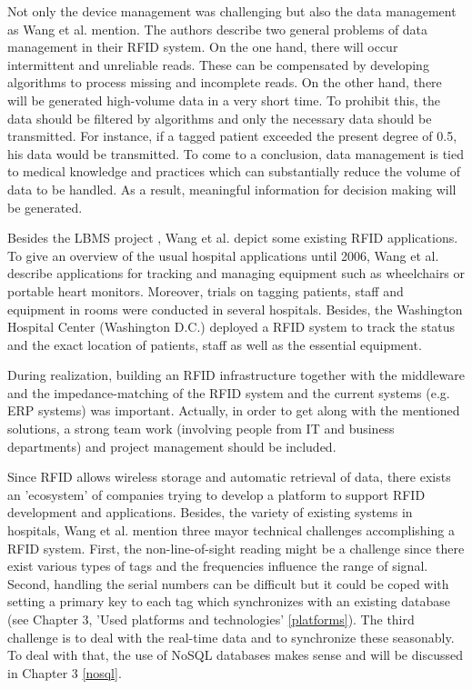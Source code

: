 Not only the device management was challenging but also the data management as Wang et al. mention. The authors describe two general problems of data management in their RFID system. On the one hand, there will occur intermittent and unreliable reads. These can be compensated by developing algorithms to process missing and incomplete reads. On the other hand, there will be generated high-volume data in a very short time. To prohibit this, the data should be filtered by algorithms and only the necessary data should be transmitted. For instance, if a tagged patient exceeded the present degree of 0.5\celsius, his data would be transmitted. To come to a conclusion, data management is tied to medical knowledge and practices which can substantially reduce the volume of data to be handled. As a result, meaningful information for decision making will be generated.
 
Besides the LBMS project \cite[p.2 ff.]{casestudy}, Wang et al. depict some existing RFID applications.
To give an overview of the usual hospital applications until 2006, Wang et al. describe applications for tracking and managing equipment such as wheelchairs or portable heart monitors. Moreover, trials on tagging patients, staff and equipment in rooms were conducted in several hospitals. Besides, the Washington Hospital Center (Washington D.C.) deployed a RFID system to track the status and the exact location of patients, staff as well as the essential equipment.

During realization, building an RFID infrastructure together with the middleware and the impedance-matching of the RFID system and the current systems (e.g. \ac{ERP} systems) was important. Actually, in order to get along with the mentioned solutions, a strong team work (involving people from IT and business departments) and project management should be included. 

Since RFID allows wireless storage and automatic retrieval of data, there exists an 'ecosystem' of companies trying to develop a platform to support RFID development and applications. Besides, the variety of existing systems in hospitals, Wang et al. mention three mayor technical challenges accomplishing a RFID system. First, the non-line-of-sight reading might be a challenge since there exist various types of tags and the frequencies influence the range of signal. Second, handling the serial numbers can be difficult but it could be coped with setting a primary key to each tag which synchronizes with an existing database (see Chapter 3, 'Used platforms and technologies' \ref{platforms}).
The third challenge is to deal with the real-time data and to synchronize these seasonably. To deal with that, the use of NoSQL databases makes sense and will be discussed in Chapter 3 \ref{nosql}.

